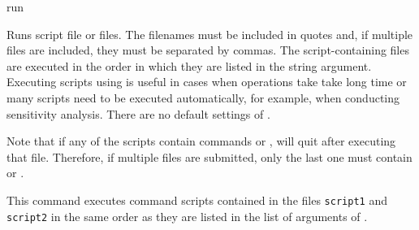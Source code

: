 \begin{command}{run}{}

	\syntax{\obligatory{(\poystring)}}

	\begin{poydescription}
        Runs \poy script file or files. The filenames must be included in
        quotes and, if multiple files are included, they must be separated by commas.
        The script-containing files are executed in the order in which they are listed
        in the string argument.
        Executing scripts using  is useful in cases when
        operations take take long time or many scripts need to be executed automatically,
        for example, when conducting sensitivity analysis.
        There are no default settings of .
        \end{poydescription}
        
        \begin{statement}
  	Note that if any of the scripts contain commands  or
	, \poy will quit after executing that file. Therefore, if
	multiple files are submitted, only the last one must contain 
	or .
	\end{statement}
	
	\begin{poyexamples}
            {This command executes \poy command scripts contained in the files \texttt{script1}
            and \texttt{script2} in the same order as they are listed in the list of arguments of
            .}
          \end{poyexamples}
          
          \begin{poyalso}
	\end{poyalso}

\end{command}


